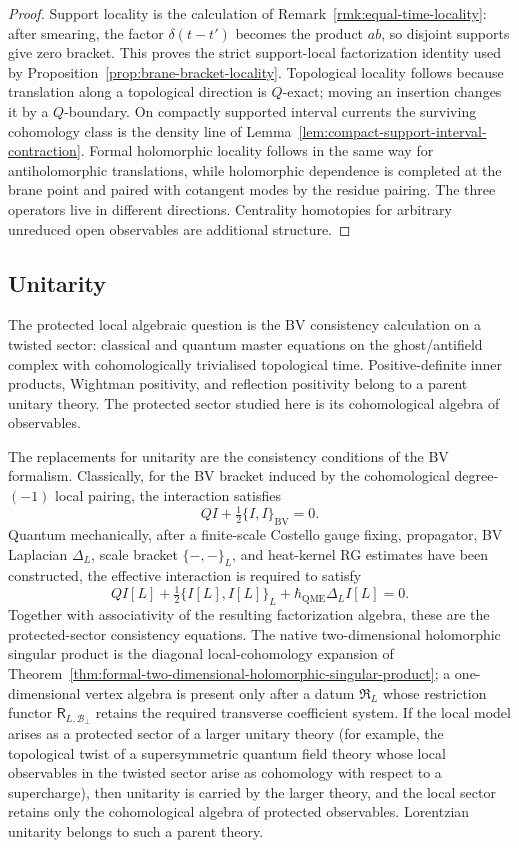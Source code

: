 \documentclass[11pt]{memoir}
\begin{document}
\begin{proof}
  Support locality is the calculation of
  Remark~\ref{rmk:equal-time-locality}: after smearing, the factor
  \(\delta(t-t')\) becomes the product \(ab\), so disjoint supports give
  zero bracket. This proves the strict support-local factorization
  identity used by Proposition~\ref{prop:brane-bracket-locality}.
  Topological locality follows because translation along a topological
  direction is \(Q\)-exact; moving an insertion changes it by a
  \(Q\)-boundary. On compactly supported interval currents the surviving
  cohomology class is the density line of
  Lemma~\ref{lem:compact-support-interval-contraction}. Formal
  holomorphic locality follows in the same way for antiholomorphic
  translations, while holomorphic dependence is completed at the brane
  point and paired with cotangent modes by the residue pairing. The three
  operators live in different directions.  Centrality homotopies for
  arbitrary unreduced open observables are additional structure.
\end{proof}

\subsection{Unitarity}

The protected local algebraic question is the BV consistency calculation
on a twisted sector: classical and quantum master equations on the
ghost/antifield complex with cohomologically trivialised topological time.
Positive-definite inner products, Wightman positivity, and reflection
positivity belong to a parent unitary theory.  The protected sector
studied here is its cohomological algebra of observables.

The replacements for unitarity are the consistency conditions of the BV
formalism.  Classically, for the BV bracket induced by the
cohomological degree-\((-1)\) local pairing, the interaction satisfies
\[
  QI+\tfrac12\{I,I\}_{\mathrm{BV}}=0 .
\]
Quantum mechanically, after a finite-scale Costello gauge fixing,
propagator, BV Laplacian \(\Delta_L\), scale bracket
\(\{-,-\}_L\), and heat-kernel RG estimates have been constructed, the
effective interaction is required to satisfy
\[
  QI[L]+\tfrac12\{I[L],I[L]\}_L+\hbar_{\mathrm{QME}}\Delta_L I[L]=0 .
\]
Together with associativity of the resulting factorization algebra, these
are the protected-sector consistency equations.  The
native two-dimensional holomorphic singular product is the diagonal
local-cohomology expansion of
Theorem~\ref{thm:formal-two-dimensional-holomorphic-singular-product}; a
one-dimensional vertex algebra is present only after a datum
\(\mathfrak R_L\) whose restriction functor
\(\mathsf R_{L,\mathcal B_\perp}\) retains the required transverse
coefficient system.  If
the local model arises as a protected sector of a larger unitary theory
(for example, the topological twist of a supersymmetric quantum field
theory whose local observables in the twisted sector arise as cohomology
with respect to a supercharge), then unitarity is carried by the larger
theory, and the local sector retains only the cohomological algebra of
protected observables.  Lorentzian unitarity belongs to such a parent
theory.
\end{document}
